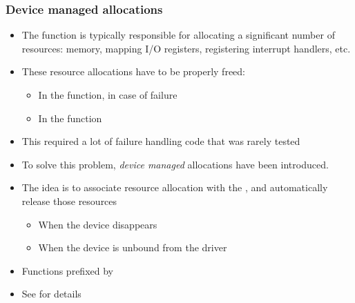 \begin{frame}
  \frametitle{Device managed allocations}
  \begin{itemize}
  \item The  function is typically responsible for
    allocating a significant number of resources: memory, mapping I/O
    registers, registering interrupt handlers, etc.
  \item These resource allocations have to be properly freed:
    \begin{itemize}
    \item In the  function, in case of failure
    \item In the  function
    \end{itemize}
  \item This required a lot of failure handling code that was rarely
    tested
  \item To solve this problem, {\em device managed} allocations have
    been introduced.
  \item The idea is to associate resource allocation with the
    , and automatically release those resources
    \begin{itemize}
    \item When the device disappears
    \item When the device is unbound from the driver
    \end{itemize}
  \item Functions prefixed by 
  \item See  for details
  \end{itemize}
\end{frame}

